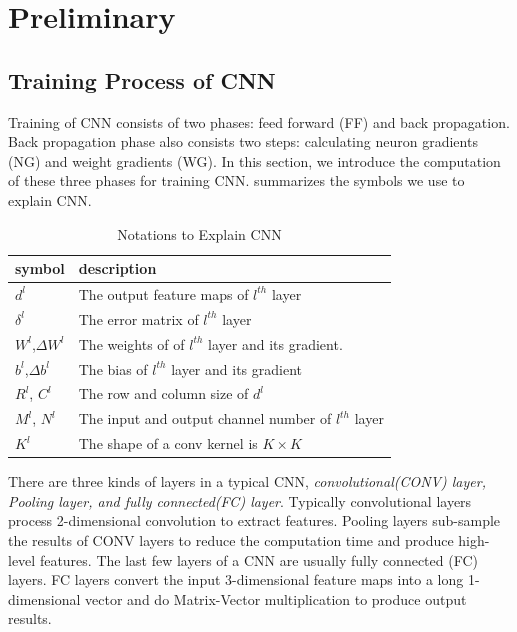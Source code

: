 \section{Preliminary}\label{sec:preliminary}

\subsection{Training Process of CNN}
Training of CNN consists of two phases: feed forward (FF) and back propagation. Back propagation phase also consists two steps: calculating neuron gradients (NG) and weight gradients (WG). In this section, we introduce the computation of these three phases for training CNN. summarizes the symbols we use to explain CNN.

\begin{table}[htbp]
    \centering
    \caption{Notations to Explain CNN}
	\begin{tabular}{|l|p{5cm}|}
      \hline
      symbol & description \bigstrut\\
      \hline
      $d ^l$ & The output feature maps of $l^{th}$ layer \bigstrut\\
      \hline
      $\delta ^{l}$ & The error matrix of $l^{th}$ layer \bigstrut\\
      \hline
      $W ^{l}$,$\Delta W^{l}$ & The weights of of $l^{th}$ layer and its gradient. \bigstrut\\
      \hline
      $b ^ l$,$\Delta b ^ l$ & The bias of $l^{th}$ layer and its gradient \bigstrut\\
      \hline
      $ R^l$, $C^l $ & The row and column size of $d ^l$ \bigstrut\\
      \hline
      $ M^l$, $N^l $ & The input and output channel number of $l^{th}$ layer \bigstrut\\
      \hline
      $ K^l $ & The shape of a conv kernel is $K \times K$ \bigstrut\\
      \hline
    \end{tabular}%
    
    \label{tab:Notations}%
  \end{table}%
  
There are three kinds of layers in a typical CNN, \textit{convolutional(CONV) layer, Pooling layer, and fully connected(FC) layer}. Typically convolutional layers process 2-dimensional convolution to extract features. Pooling layers sub-sample the results of CONV layers to reduce the computation time and produce high-level features. The last few layers of a CNN are usually fully connected (FC) layers. FC layers convert the input 3-dimensional feature maps into a long 1-dimensional vector and do Matrix-Vector multiplication to produce output results.
  
